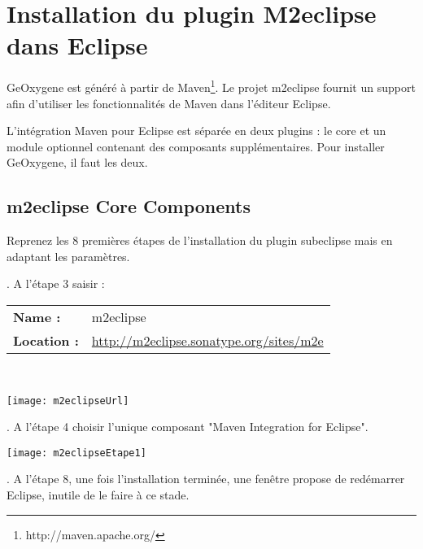 % 

\section{Installation du plugin M2eclipse dans Eclipse}

GeOxygene est généré à partir de Maven\footnote{http://maven.apache.org/}.  Le projet m2eclipse fournit un support afin d'utiliser les fonctionnalités de Maven dans l'éditeur Eclipse.

\medskip

\noindent
L'intégration Maven pour Eclipse est séparée en deux plugins : le core et un module optionnel contenant des composants supplémentaires. Pour installer GeOxygene, il faut les deux.


\subsection{m2eclipse Core Components}
Reprenez les 8 premières étapes de l'installation du plugin subeclipse mais en adaptant les paramètres.

\medskip

. A l'étape 3 saisir :\\

\begin{tabular}[!t]{ll}
{\bf Name : }&{m2eclipse}\\
{\bf Location : }&{\href{http://m2eclipse.sonatype.org/sites/m2e}{http://m2eclipse.sonatype.org/sites/m2e}}\\
\end{tabular}\\

\smallskip
\begin{center}
\texttt{[image: m2eclipseUrl]}
\end{center}

. A l'étape 4 choisir l'unique composant "Maven Integration for Eclipse".\\
\begin{center}
\texttt{[image: m2eclipseEtape1]}
\end{center}

. A l'étape 8, une fois l'installation terminée, une fenêtre propose de redémarrer Eclipse, inutile de le faire à ce stade.




